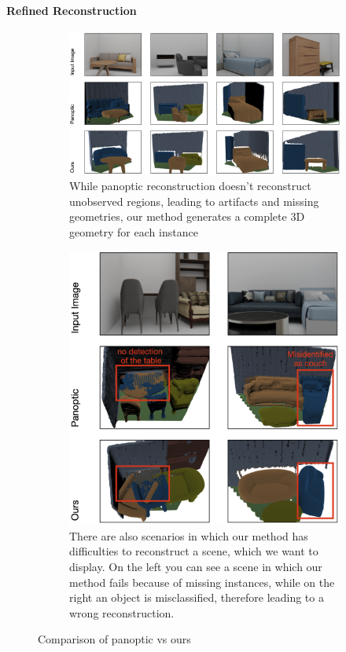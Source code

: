 \paragraph{Refined Reconstruction}

\begin{figure}%
  \begin{subfigure}[t]{109mm}
    \includegraphics[width=\linewidth]{images/image1.png}
    \caption{While panoptic reconstruction doesn't reconstruct unobserved regions, leading to artifacts and missing geometries, our method generates a complete 3D geometry for each instance}\label{fig:comparison_good}
  \end{subfigure}
  \qquad
  \begin{subfigure}[t]{56mm}
    \includegraphics[width=\linewidth]{images/image2.png}
    \caption{There are also scenarios in which our method has difficulties to reconstruct a scene, which we want to display. On the left you can see a scene in which our method fails because of missing instances, while on the right an object is misclassified, therefore leading to a wrong reconstruction.}\label{fig:comparison_bad}
  \end{subfigure}
  \caption{Comparison of panoptic vs ours}
  \label{fig:comparison_all}
\end{figure}

